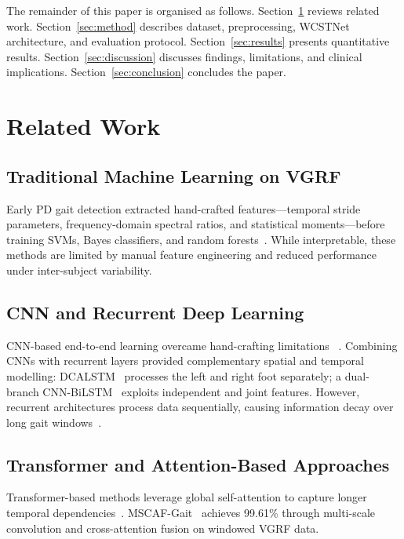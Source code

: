\documentclass[lettersize,journal]{IEEEtran}
\begin{document}
The remainder of this paper is organised as follows.
Section~\ref{sec:related} reviews related work.
Section~\ref{sec:method} describes dataset, preprocessing, WCSTNet
architecture, and evaluation protocol.
Section~\ref{sec:results} presents quantitative results.
Section~\ref{sec:discussion} discusses findings, limitations, and
clinical implications.
Section~\ref{sec:conclusion} concludes the paper.

\section{Related Work}
\label{sec:related}

\subsection{Traditional Machine Learning on VGRF}
Early PD gait detection extracted hand-crafted features—temporal
stride parameters, frequency-domain spectral ratios, and statistical
moments—before training SVMs, Bayes classifiers, and random
forests~\cite{alam2017vgrf,ertugrul2016lbp,prabhu2020,
abdulhay2018,balaji2021}.
While interpretable, these methods are limited by manual feature
engineering and reduced performance under inter-subject variability.

\subsection{CNN and Recurrent Deep Learning}
CNN-based end-to-end learning overcame hand-crafting limitations~%
\cite{maachi2020convnet}.
Combining CNNs with recurrent layers provided complementary spatial
and temporal modelling: DCALSTM~\cite{xia2020dcalstm} processes the
left and right foot separately; a dual-branch CNN-BiLSTM~%
\cite{liu2021dualbranch} exploits independent and joint features.
However, recurrent architectures process data sequentially, causing
information decay over long gait windows~\cite{naimi2023hct}.

\subsection{Transformer and Attention-Based Approaches}
Transformer-based methods leverage global self-attention to capture
longer temporal dependencies~\cite{nguyen2022transformer,naimi2023hct}.
MSCAF-Gait~\cite{yuan2025mscaf} achieves 99.61\% through multi-scale
convolution and cross-attention fusion on windowed VGRF data.
\end{document}
